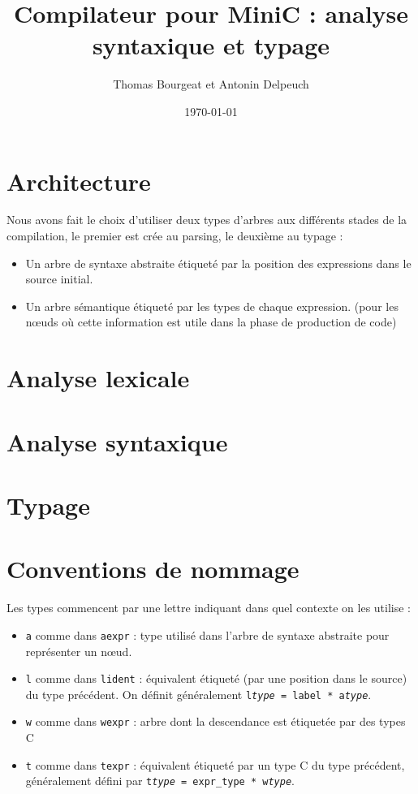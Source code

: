 \documentclass[a4paper]{article}
\begin{document}
\title{Compilateur pour MiniC : analyse syntaxique et typage}
\author{Thomas Bourgeat et Antonin Delpeuch}
\date{\today}

\maketitle

\section{Architecture}

Nous avons fait le choix d'utiliser deux types d'arbres aux différents
stades de la compilation, le premier est crée au parsing, le deuxième au
typage :
\begin{itemize}
    \item Un arbre de syntaxe abstraite étiqueté par la position des
expressions dans le source initial.
    \item Un arbre sémantique étiqueté par les types de chaque
expression.
(pour les nœuds où cette information est utile dans la phase de
production de code)
\end{itemize}

\section{Analyse lexicale}

\section{Analyse syntaxique}

\section{Typage}

\appendix
\section{Conventions de nommage}

Les types commencent par une lettre indiquant dans quel contexte on les utilise :
\begin{itemize}
    \item \texttt{a} comme dans \texttt{aexpr} : type utilisé dans l'arbre de syntaxe abstraite pour représenter un nœud.
    \item \texttt{l} comme dans \texttt{lident} : équivalent étiqueté (par une position dans le source) du type précédent.
    On définit généralement \texttt{l\emph{type} = label * a\emph{type}}.
\item \texttt{w} comme dans \texttt{wexpr} : arbre dont la descendance est étiquetée par des types C
\item \texttt{t} comme dans \texttt{texpr} : équivalent étiqueté par un type C du type précédent, généralement défini par \texttt{t\emph{type} = expr\_type * w\emph{type}}.
\end{itemize}
\end{document}
